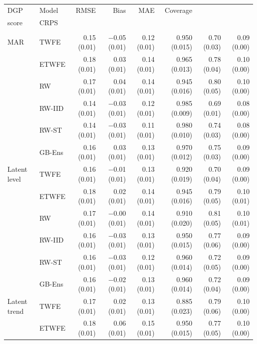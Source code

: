 \begin{table}
\fontsize{9.0pt}{11.0pt}\selectfont\setlength\tabcolsep{3.5pt}
\begin{tabular*}{1\linewidth}{@{\extracolsep{\fill}}llrrrrrr}
\toprule
DGP & Model & RMSE & Bias & MAE & Coverage & \begin{tabular}[b]{@{}r@{}}Interval\\score\end{tabular} & CRPS \\ 
\midrule\addlinespace[2.5pt]
\multicolumn{8}{l}{Without covariates, event year 0} \\[2.5pt] 
\midrule\addlinespace[2.5pt]
MAR & TWFE & 0.15 (0.01) & −0.05 (0.01) & 0.12 (0.01) & 0.950 (0.015) & 0.70 (0.03) & 0.09 (0.00) \\ 
 & ETWFE & 0.18 (0.01) & 0.03 (0.01) & 0.14 (0.01) & 0.965 (0.013) & 0.78 (0.04) & 0.10 (0.00) \\ 
 & RW & 0.17 (0.01) & 0.04 (0.01) & 0.14 (0.01) & 0.945 (0.016) & 0.80 (0.05) & 0.10 (0.00) \\ 
 & RW-IID & 0.14 (0.01) & −0.03 (0.01) & 0.12 (0.01) & 0.985 (0.009) & 0.69 (0.01) & 0.08 (0.00) \\ 
 & RW-ST & 0.14 (0.01) & −0.03 (0.01) & 0.11 (0.01) & 0.980 (0.010) & 0.74 (0.03) & 0.08 (0.00) \\ 
 & GB-Ens & 0.16 (0.01) & 0.03 (0.01) & 0.13 (0.01) & 0.970 (0.012) & 0.75 (0.03) & 0.09 (0.00) \\ 
Latent level & TWFE & 0.16 (0.01) & −0.01 (0.01) & 0.13 (0.01) & 0.920 (0.019) & 0.70 (0.04) & 0.09 (0.00) \\ 
 & ETWFE & 0.18 (0.01) & 0.02 (0.01) & 0.14 (0.01) & 0.945 (0.016) & 0.79 (0.05) & 0.10 (0.01) \\ 
 & RW & 0.17 (0.01) & −0.00 (0.01) & 0.14 (0.01) & 0.910 (0.020) & 0.81 (0.05) & 0.10 (0.01) \\ 
 & RW-IID & 0.16 (0.01) & −0.03 (0.01) & 0.13 (0.01) & 0.950 (0.015) & 0.77 (0.06) & 0.09 (0.00) \\ 
 & RW-ST & 0.16 (0.01) & −0.03 (0.01) & 0.12 (0.01) & 0.960 (0.014) & 0.72 (0.05) & 0.09 (0.00) \\ 
 & GB-Ens & 0.16 (0.01) & −0.02 (0.01) & 0.13 (0.01) & 0.960 (0.014) & 0.72 (0.04) & 0.09 (0.00) \\ 
Latent trend & TWFE & 0.17 (0.01) & 0.02 (0.01) & 0.13 (0.01) & 0.885 (0.023) & 0.79 (0.06) & 0.10 (0.00) \\ 
 & ETWFE & 0.18 (0.01) & 0.06 (0.01) & 0.15 (0.01) & 0.950 (0.015) & 0.77 (0.05) & 0.10 (0.00) \\ 

\end{tabular*}
\end{table}
